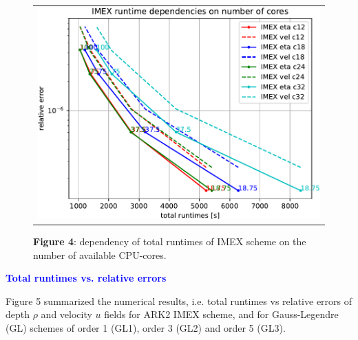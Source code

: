 \documentclass[a4paper]{article}
\begin{document}
\begin{figure}[t]\centering
\begin{tabular}{c}
 \hspace{-0.4em}\includegraphics[scale=0.66]{Images/Figure_1_new1-crop.pdf}
  \end{tabular}
\caption*{{\bfseries Figure 4}: dependency of total runtimes
    of IMEX scheme on the number of available CPU-cores.
  }
  \end{figure}
  \vspace{2cm}


\noindent \textcolor{blue}{\textbf{Total runtimes vs. relative errors}}

  Figure 5 summarized the numerical results, i.e. total runtimes vs
  relative errors of depth $\rho$ and velocity $ u$ fields for ARK2 IMEX
  scheme, and for Gauss-Legendre (GL) schemes of order 1 (GL1), order 3 (GL2) and order 5 (GL3).
\end{document}
